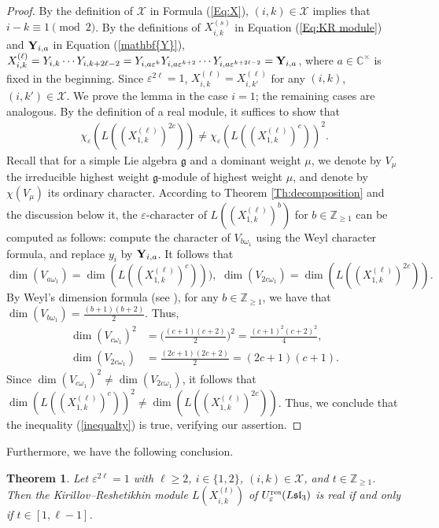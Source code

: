 \documentclass[11pt, reqno]{amsart}
\theoremstyle{plain}
\newtheorem{theorem}{Theorem}[section]
\theoremstyle{definition}
\numberwithin{equation}{section}
\newcommand{\ZZ}{{\mathbb {Z}}}
\newcommand{\res}{{\rm res}}
\begin{document}
\begin{proof}
By the definition of $\mathcal{X}$ in Formula (\ref{Eq:X}), $(i,k)\in \mathcal{X}$ implies that $i-k \equiv 1 \pmod{2}$. By the definitions of $X^{(s)}_{i,k}$ in Equation (\ref{Eq:KR module}) and ${\bf Y}_{i, a}$ in Equation (\ref{mathbf{Y}}), $X^{(\ell)}_{i, k} = Y_{i,k} \cdots Y_{i,k+2\ell-2} = Y_{i, a\varepsilon^k} Y_{i, a\varepsilon^{k+2}} \cdots Y_{i, a\varepsilon^{k+2\ell-2}} = {\bf Y}_{i, a}$, where $a \in \mathbb{C}^{\times}$ is fixed in the beginning. Since $\varepsilon^{2\ell}=1$, $X^{(\ell)}_{i, k} = X^{(\ell)}_{i, k'}$ for any $(i,k)$, $(i,k') \in \mathcal{X}$. We prove the lemma in the case $i=1$; the remaining cases are analogous. By the definition of a real module, it suffices to show that
\begin{align}\label{inequalty}
\chi_{\varepsilon}(L((X^{(\ell)}_{1, k})^{2c}))\neq  \chi_{\varepsilon}(L((X^{(\ell)}_{1, k})^c))^2.
\end{align}
Recall that for a simple Lie algebra $\mathfrak{g}$ and a dominant weight $\mu$, we denote by $V_{\mu}$ the irreducible highest weight $\mathfrak{g}$-module of highest weight $\mu$, and denote by $\chi(V_{\mu})$ its ordinary character. According to Theorem \ref{Th:decomposition} and the discussion below it, the $\varepsilon$-character of $L((X^{(\ell)}_{1, k})^{b})$ for $b \in \ZZ_{\ge 1}$ can be computed as follows: compute the character of $V_{b\omega_1}$ using the Weyl character formula, and replace $y_i$ by ${\bf Y}_{i,a}$.
It follows that
\[
\dim(V_{a\omega_1})=\dim(L((X^{(\ell)}_{1, k})^c))),\,\, \dim(V_{2c\omega_1})=\dim(L((X^{(\ell)}_{1, k})^{2c})).
\]
By Weyl's dimension formula (see \cite[Section VI]{Hu1978}), for any $b\in\ZZ_{\geq 1}$, we have that $\dim(V_{b\omega_1})=\frac{(b+1)(b+2)}{2}$. Thus,
\begin{align*}
\dim(V_{c\omega_1})^2&=\big(\frac{(c+1)(c+2)}{2}\big)^2=\frac{(c+1)^2(c+2)^2}{4},\\
\dim(V_{2c\omega_1})&=\frac{(2c+1)(2c+2)}{2}=(2c+1)(c+1).
\end{align*}
Since $\dim(V_{c\omega_1})^2\neq \dim(V_{2c\omega_1})$, it follows that $\dim(L((X^{(\ell)}_{1, k})^c))^2\neq \dim(L((X^{(\ell)}_{1, k})^{2c}))$. Thus, we conclude that the inequality (\ref{inequalty}) is true, verifying our assertion.
\end{proof}

Furthermore, we have the following conclusion.
\begin{theorem}\label{Th: real KR module}
Let $\varepsilon^{2 \ell}=1$ with $\ell\geq 2$, $i \in \{1,2\}$, $(i,k)\in \mathcal{X}$, and $t \in \ZZ_{\ge 1}$. Then the Kirillov--Reshetikhin module $L(X^{(t)}_{i,k})$ of $U_\varepsilon^\res({L\mathfrak{sl}_{3}})$ is real if and only if $t\in[1,\ell-1]$. 
\end{theorem}
\end{document}
